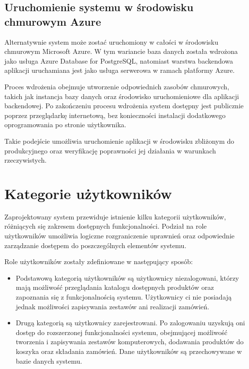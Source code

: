 \documentclass[a4paper,twoside,12pt]{book}
\begin{document}
\subsection{Uruchomienie systemu w środowisku chmurowym Azure}

Alternatywnie system może zostać uruchomiony w całości w środowisku chmurowym
Microsoft Azure. W tym wariancie baza danych została wdrożona jako usługa Azure
Database for PostgreSQL, natomiast warstwa backendowa aplikacji uruchamiana jest
jako usługa serwerowa w ramach platformy Azure.

Proces wdrożenia obejmuje utworzenie odpowiednich zasobów chmurowych, takich jak
instancja bazy danych oraz środowisko uruchomieniowe dla aplikacji backendowej.
Po zakończeniu procesu wdrożenia system dostępny jest publicznie poprzez
przeglądarkę internetową, bez konieczności instalacji dodatkowego oprogramowania
po stronie użytkownika.

Takie podejście umożliwia uruchomienie aplikacji w środowisku zbliżonym do
produkcyjnego oraz weryfikację poprawności jej działania w warunkach
rzeczywistych.

\section{Kategorie użytkowników}

Zaprojektowany system przewiduje istnienie kilku kategorii użytkowników,
różniących się zakresem dostępnych funkcjonalności. Podział na role użytkowników
umożliwia logiczne rozgraniczenie uprawnień oraz odpowiednie zarządzanie dostępem
do poszczególnych elementów systemu.

Role użytkowników zostały zdefiniowane w następujący sposób:
\begin{itemize}
    \item Podstawową kategorią użytkowników są użytkownicy niezalogowani, którzy mają
możliwość przeglądania katalogu dostępnych produktów oraz zapoznania się z
funkcjonalnością systemu. Użytkownicy ci nie posiadają jednak możliwości
zapisywania zestawów ani realizacji zamówień.
    \item Drugą kategorią są użytkownicy zarejestrowani. Po zalogowaniu uzyskują oni dostęp
do rozszerzonej funkcjonalności systemu, obejmującej możliwość tworzenia i
zapisywania zestawów komputerowych, dodawania produktów do koszyka oraz składania
zamówień. Dane użytkowników są przechowywane w bazie danych systemu.
    
\end{itemize}
\end{document}
